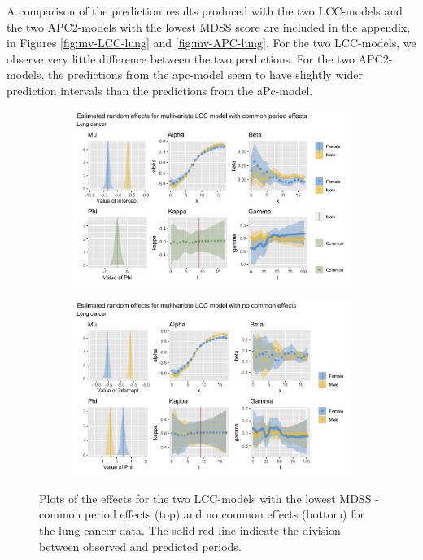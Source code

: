 \newpar A comparison of the prediction results produced with the two LCC-models and the two APC2-models with the lowest MDSS score are included in the appendix, in Figures \ref{fig:mv-LCC-lung} and \ref{fig:mv-APC-lung}.
For the two LCC-models, we observe very little difference between the two predictions. For the two APC2-models, the predictions from the apc-model seem to have slightly wider prediction intervals than the predictions from the aPc-model.

\begin{figure}[h!]
    \centering
    \begin{subfigure}[b]{.6\linewidth}
        \includegraphics[width=\linewidth]{real-data/real-data-multivariate/Figures/effects-LCC-common-period-lung.png}
    \end{subfigure}
    
    \begin{subfigure}[b]{.6\linewidth}
        \includegraphics[width=\linewidth]{real-data/real-data-multivariate/Figures/effects-LCC-no-common-lung.png}
    \end{subfigure}
    \caption{Plots of the effects for the two LCC-models with the lowest MDSS - common period effects (top) and no common effects (bottom) for the lung cancer data. The solid red line indicate the division between observed and predicted periods. }
    \label{fig:effects-LCC-lung}
\end{figure}

